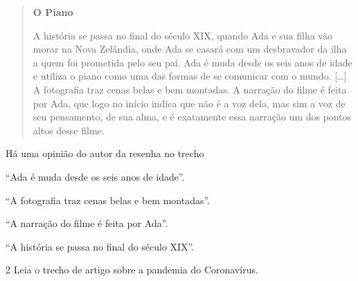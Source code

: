 \begin{quote}
\textbf{O Piano}


A história se passa no final do século XIX, quando Ada e sua filha vão
morar na Nova Zelândia, onde Ada se casará com um desbravador da ilha a
quem foi prometida pelo seu pai. Ada é muda desde os seis anos de idade
e utiliza o piano como uma das formas de se comunicar com o mundo.
{[}\ldots{}{]} A fotografia traz cenas belas e bem montadas. A narração
do filme é feita por Ada, que logo no início indica que não é a voz
dela, mas sim a voz de seu pensamento, de sua alma, e é exatamente essa
narração um dos pontos altos desse filme.

\end{quote}

\pagebreak
Há uma opinião do autor da resenha no trecho

\begin{escolha}
\item ``Ada é muda desde os seis anos de idade''.

\item ``A fotografia traz cenas belas e bem montadas''.

\item ``A narração do filme é feita por Ada''.

\item ``A história se passa no final do século XIX''.
\end{escolha}

\num{2} Leia o trecho de artigo sobre a pandemia do Coronavírus.

